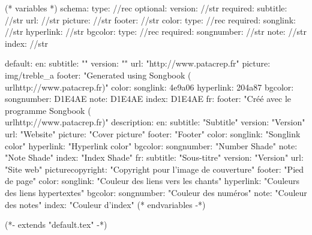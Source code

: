 
(* variables *)
schema:
  type: //rec
  optional:
    version: //str
  required:
    subtitle: //str
    url: //str
    picture: //str
    footer: //str
    color:
      type: //rec
      required:
        songlink: //str
        hyperlink: //str
    bgcolor:
      type: //rec
      required:
        songnumber: //str
        note: //str
        index: //str

default:
  en:
    subtitle: ""
    version: ""
    url: "http://www.patacrep.fr"
    picture: img/treble_a
    footer: "Generated using Songbook (\\url{http://www.patacrep.fr})"
    color:
      songlink: 4e9a06
      hyperlink: 204a87
    bgcolor:
      songnumber: D1E4AE
      note: D1E4AE
      index: D1E4AE
  fr:
    footer: "Créé avec le programme Songbook (\\url{http://www.patacrep.fr})"
description:
  en:
    subtitle: "Subtitle"
    version: "Version"
    url: "Website"
    picture: "Cover picture"
    footer: "Footer"
    color:
      songlink: "Songlink color"
      hyperlink: "Hyperlink color"
    bgcolor:
      songnumber: "Number Shade"
      note: "Note Shade"
      index: "Index Shade"
  fr:
    subtitle: "Sous-titre"
    version: "Version"
    url: "Site web"
    picturecopyright: "Copyright pour l'image de couverture"
    footer: "Pied de page"
    color:
      songlink: "Couleur des liens vers les chants"
      hyperlink: "Couleurs des liens hypertextes"
    bgcolor:
      songnumber: "Couleur des numéros"
      note: "Couleur des notes"
      index: "Couleur d'index"
(* endvariables -*)

(*- extends "default.tex" -*)

